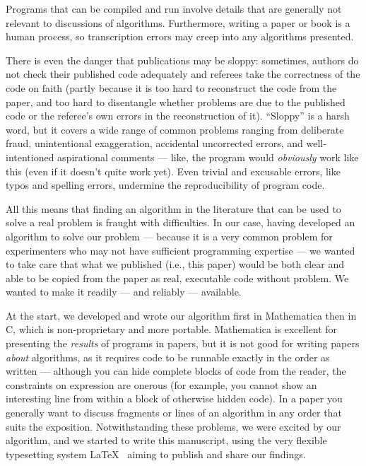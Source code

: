 \documentclass[preprint,times]{elsarticle}
\begin{document}
Programs that can be compiled and run involve details that are generally not relevant to discussions of algorithms. Furthermore, writing a paper or book is a human process, so transcription errors may creep into any algorithms presented. 

There is even the danger that publications may be sloppy: sometimes, authors do not check their published code adequately and referees take the correctness of the code on faith (partly because it is too hard to reconstruct the code from the paper, and too hard to disentangle whether problems are due to the published code or the referee's own errors in the reconstruction of it). ``Sloppy'' is a harsh word, but it covers a wide range of common problems ranging from deliberate fraud, unintentional exaggeration, accidental uncorrected errors, and well-intentioned aspirational comments --- like, the program would \emph{obviously\/} work like this (even if it doesn't quite work yet). Even trivial and excusable errors, like typos and spelling errors, undermine the reproducibility of program code.

All this means that finding an algorithm in the literature that can be used to solve a real problem is fraught with difficulties. In our case, having developed an algorithm to solve our problem --- because it is a very common problem for experimenters who may not have sufficient programming expertise --- we wanted to take care that what we published (i.e., this paper) would be both clear and able to be copied from the paper as real, executable code without problem. We wanted to make it readily --- and reliably --- available.

At the start, we developed and wrote our algorithm first in Mathematica then in C, which is non-proprietary and more portable. Mathematica is excellent for presenting the \emph{results\/} of programs in papers, but it is not good for writing papers \emph{about\/} algorithms, as it requires code to be runnable exactly in the order as written --- although you can hide complete blocks of code from the reader, the constraints on expression are onerous (for example, you cannot show an interesting line from within a block of otherwise hidden code). In a paper you generally want to discuss fragments or lines of an algorithm in any order that suits the exposition. Notwithstanding these problems, we were excited by our algorithm, and we started to write this manuscript, using the very flexible typesetting system \LaTeX\ \cite{latex} aiming to publish and share our findings.
\end{document}
